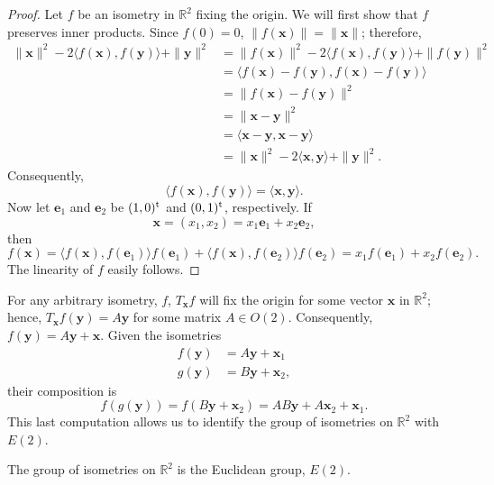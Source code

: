  
\begin{proof}
Let $f$ be an isometry in ${\mathbb R}^2$ fixing the origin. We will
first show that $f$ preserves inner products. Since $f(0) = 0$, $\|
f({\mathbf x})\| = \| {\mathbf x} \|$; therefore,
\begin{align*}
\| {\mathbf x} \|^2 - 2 \langle f({\mathbf x}), f({\mathbf y}) \rangle + \|
{\mathbf y} \|^2 
& =
\| f({\mathbf x}) \|^2 - 2 \langle f({\mathbf x}), f({\mathbf y}) \rangle +
\| f({\mathbf y}) \|^2 \\ 
& =
\langle
f({\mathbf x}) -  f({\mathbf y}), f({\mathbf x}) -  f({\mathbf y})
\rangle \\
& =
\| f({\mathbf x}) -  f({\mathbf y}) \|^2 \\
& =
\| {\mathbf x} -  {\mathbf y} \|^2 \\
& =
\langle
{\mathbf x} -  {\mathbf y}, {\mathbf x} -  {\mathbf y} \rangle \\
& =
\| {\mathbf x} \|^2 - 2 \langle {\mathbf x}, {\mathbf y} \rangle + \| {\mathbf
y} \|^2. 
\end{align*}
Consequently,
\[
\langle f({\mathbf x}), f({\mathbf y}) \rangle
=
\langle {\mathbf x}, {\mathbf y} \rangle.
\]
Now let ${\mathbf e}_1$ and ${\mathbf e_2}$ be $(1, 0)^{\rm t}$ and $(0,
1)^{\rm t}$, respectively. If 
\[
{\mathbf x} = (x_1, x_2) = x_1 {\mathbf e}_1 + x_2 {\mathbf e}_2,
\]
then
\[
f({\mathbf x})
=
\langle
f({\mathbf x}), f({\mathbf e}_1)
\rangle
f({\mathbf e}_1)
+\langle
f({\mathbf x}), f({\mathbf e}_2)
\rangle
f({\mathbf e}_2)
=
x_1 f({\mathbf e}_1)+x_2 f({\mathbf e}_2).
\]
The linearity of $f$ easily follows.
\end{proof}
 
 
\medskip
 
 
For any arbitrary isometry, $f$,  $T_{\mathbf x} f$ will fix the origin
for some vector ${\mathbf x}$ in ${\mathbb R}^2$; hence, $T_{\mathbf x}
f({\mathbf y}) = A {\mathbf y}$ for some matrix $A \in O(2)$.
Consequently, $f({\mathbf y}) = A {\mathbf y} + {\mathbf x}$.  Given the
isometries 
\begin{align*}
f({\mathbf y}) & = A {\mathbf y} + {\mathbf x}_1 \\
g({\mathbf y}) & = B {\mathbf y} + {\mathbf x}_2,
\end{align*}
their composition is
\[
f(g({\mathbf y})) =
f(B {\mathbf y} + {\mathbf x}_2) =
AB {\mathbf y} + A{\mathbf x}_2 + {\mathbf x}_1.
\]
This last computation allows us to identify the group of isometries on
${\mathbb R}^2$ with~$E(2)$. 
 
 
\begin{theorem}
The group of isometries on ${\mathbb R}^2$ is the Euclidean group,
$E(2)$. 
\end{theorem}
 
